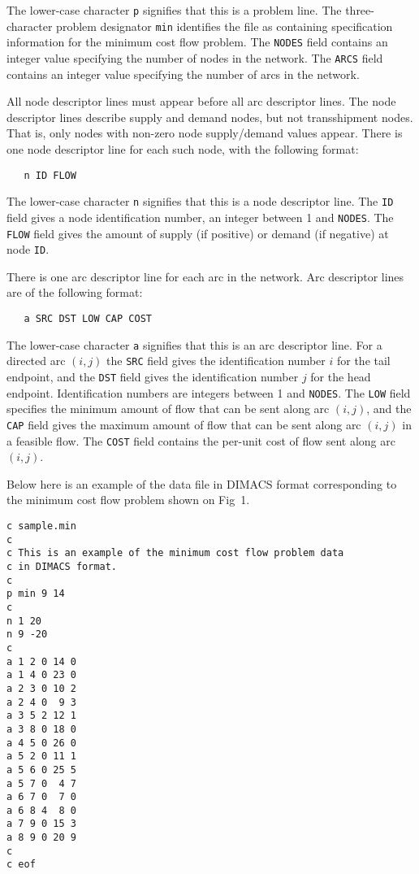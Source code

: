 \documentclass[11pt]{report}
\def\para#1{\noindent{\bf#1}}
\begin{document}
\newpage

\noindent
The lower-case character \verb|p| signifies that this is a problem line.
The three-character problem designator \verb|min| identifies the file as
containing specification information for the minimum cost flow problem.
The \verb|NODES| field contains an integer value specifying the number
of nodes in the network. The \verb|ARCS| field contains an integer value
specifying the number of arcs in the network.

\para{Node descriptors.} All node descriptor lines must appear before
all arc descriptor lines. The node descriptor lines describe supply and
demand nodes, but not transshipment nodes. That is, only nodes with
non-zero node supply/demand values appear. There is one node descriptor
line for each such node, with the following format:

\begin{verbatim}
   n ID FLOW
\end{verbatim}

\noindent
The lower-case character \verb|n| signifies that this is a node
descriptor line. The \verb|ID| field gives a node identification
number, an integer between 1 and \verb|NODES|. The \verb|FLOW| field
gives the amount of supply (if positive) or demand (if negative) at
node \verb|ID|.

\para{Arc descriptors.} There is one arc descriptor line for each arc
in the network. Arc descriptor lines are of the following format:

\begin{verbatim}
   a SRC DST LOW CAP COST
\end{verbatim}

\noindent
The lower-case character \verb|a| signifies that this is an arc
descriptor line. For a directed arc $(i,j)$ the \verb|SRC| field gives
the identification number $i$ for the tail endpoint, and the \verb|DST|
field gives the identification number $j$ for the head endpoint.
Identification numbers are integers between 1 and \verb|NODES|. The
\verb|LOW| field specifies the minimum amount of flow that can be sent
along arc $(i,j)$, and the \verb|CAP| field gives the maximum amount of
flow that can be sent along arc $(i,j)$ in a feasible flow. The
\verb|COST| field contains the per-unit cost of flow sent along arc
$(i,j)$.

\para{Example.} Below here is an example of the data file in DIMACS
format corresponding to the minimum cost flow problem shown on Fig~1.

\begin{footnotesize}
\begin{verbatim}
c sample.min
c
c This is an example of the minimum cost flow problem data
c in DIMACS format.
c
p min 9 14
c
n 1 20
n 9 -20
c
a 1 2 0 14 0
a 1 4 0 23 0
a 2 3 0 10 2
a 2 4 0  9 3
a 3 5 2 12 1
a 3 8 0 18 0
a 4 5 0 26 0
a 5 2 0 11 1
a 5 6 0 25 5
a 5 7 0  4 7
a 6 7 0  7 0
a 6 8 4  8 0
a 7 9 0 15 3
a 8 9 0 20 9
c
c eof
\end{verbatim}
\end{footnotesize}
\end{document}

